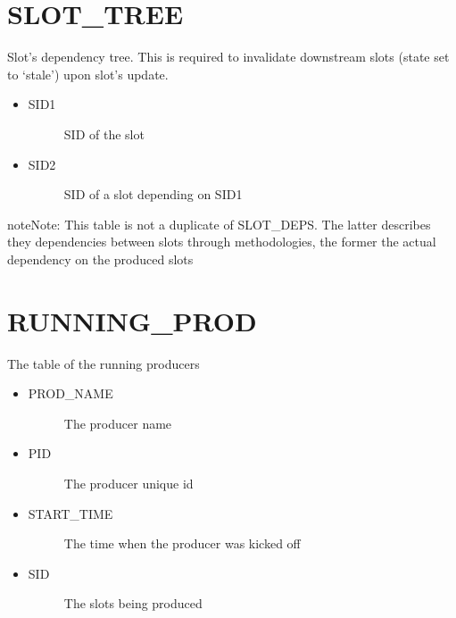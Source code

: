 \documentclass[letterpaper,10pt,english]{sphinxmanual}
\begin{document}
\section{SLOT\_TREE}
\label{\detokenize{mrb:slot-tree}}
Slot’s dependency tree. This is required to invalidate downstream slots
(state set to ‘stale’) upon slot’s update.
\begin{itemize}
\item {} \begin{description}
\item[{SID1}] \leavevmode
SID of the slot

\end{description}

\item {} \begin{description}
\item[{SID2}] \leavevmode
SID of a slot depending on SID1

\end{description}

\end{itemize}

\begin{sphinxadmonition}{note}{Note:}
This table is not a duplicate of SLOT\_DEPS. The latter describes they
dependencies between slots through methodologies, the former
the actual dependency on the produced slots
\end{sphinxadmonition}


\section{RUNNING\_PROD}
\label{\detokenize{mrb:running-prod}}
The table of the running producers
\begin{itemize}
\item {} \begin{description}
\item[{PROD\_NAME}] \leavevmode
The producer name

\end{description}

\item {} \begin{description}
\item[{PID}] \leavevmode
The producer unique id

\end{description}

\item {} \begin{description}
\item[{START\_TIME}] \leavevmode
The time when the producer was kicked off

\end{description}

\item {} \begin{description}
\item[{SID}] \leavevmode
The slots being produced

\end{description}

\end{itemize}
\end{document}
